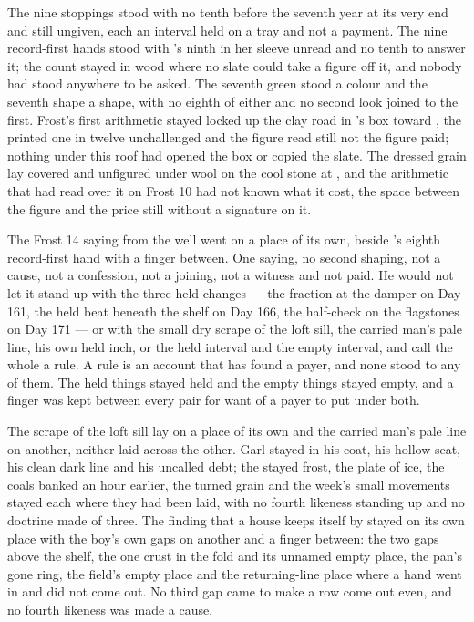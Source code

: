 The nine stoppings stood with no tenth before the seventh year at its very end and still ungiven, each an interval held on a tray and not a payment. The nine record-first hands stood with 's ninth in her sleeve unread and no tenth to answer it; the count stayed in wood where no slate could take a figure off it, and nobody had stood anywhere to be asked. The seventh green stood a colour and the seventh shape a shape, with no eighth of either and no second look joined to the first. Frost's first arithmetic stayed locked up the clay road in 's box toward , the printed one in twelve unchallenged and the figure read still not the figure paid; nothing under this roof had opened the box or copied the slate. The dressed grain lay covered and unfigured under wool on the cool stone at , and the arithmetic that had read over it on Frost 10 had not known what it cost, the space between the figure and the price still without a signature on it.

The Frost 14 saying from the well went on a place of its own, beside 's eighth record-first hand with a finger between. One saying, no second shaping, not a cause, not a confession, not a joining, not a witness and not paid. He would not let it stand up with the three held changes --- the fraction at the damper on Day 161, the held beat beneath the shelf on Day 166, the half-check on the flagstones on Day 171 --- or with the small dry scrape of the loft sill, the carried man's pale line, his own held inch, or the held interval and the empty interval, and call the whole a rule. A rule is an account that has found a payer, and none stood to any of them. The held things stayed held and the empty things stayed empty, and a finger was kept between every pair for want of a payer to put under both.

The scrape of the loft sill lay on a place of its own and the carried man's pale line on another, neither laid across the other. Garl stayed in his coat, his hollow seat, his clean dark line and his uncalled debt; the stayed frost, the plate of ice, the coals banked an hour earlier, the turned grain and the week's small movements stayed each where they had been laid, with no fourth likeness standing up and no doctrine made of three. The finding that a house keeps itself by  stayed on its own place with the boy's own gaps on another and a finger between: the two gaps above the shelf, the one crust in the fold and its unnamed empty place, the pan's gone ring, the field's empty place and the returning-line place where a hand went in and did not come out. No third gap came to make a row come out even, and no fourth likeness was made a cause.


